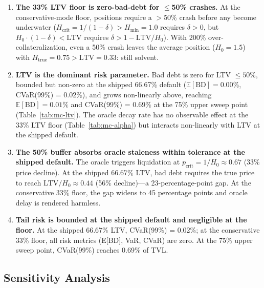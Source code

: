 \documentclass[10pt,a4paper,twocolumn]{article}
\begin{document}
\begin{enumerate}[leftmargin=*]
\item \textbf{The 33\% LTV floor is zero-bad-debt for $\leq$50\% crashes.} At the conservative-mode floor, positions require a $>$50\% crash before any become underwater ($H_{\text{crit}} = 1/(1{-}\delta) > H_{\min} = 1.0$ requires $\delta > 0$, but $H_0 \cdot (1{-}\delta) < \text{LTV}$ requires $\delta > 1 - \text{LTV}/H_0$). With 200\% over-collateralization, even a 50\% crash leaves the average position ($H_0 = 1.5$) with $H_{\text{true}} = 0.75 > \text{LTV} = 0.33$: still solvent.

\item \textbf{LTV is the dominant risk parameter.} Bad debt is zero for LTV $\leq 50\%$, bounded but non-zero at the shipped 66.67\% default ($\mathbb{E}[\text{BD}] = 0.00\%$, CVaR(99\%) = 0.02\%), and grows non-linearly above, reaching $\mathbb{E}[\text{BD}] = 0.01\%$ and CVaR(99\%) = 0.69\% at the 75\% upper sweep point (Table~\ref{tab:mc-ltv}). The oracle decay rate has no observable effect at the 33\% LTV floor (Table~\ref{tab:mc-alpha}) but interacts non-linearly with LTV at the shipped default.

\item \textbf{The 50\% buffer absorbs oracle staleness within tolerance at the shipped default.} The oracle triggers liquidation at $p_{\text{crit}} = 1/H_0 \approx 0.67$ (33\% price decline). At the shipped 66.67\% LTV, bad debt requires the true price to reach $\text{LTV}/H_0 \approx 0.44$ (56\% decline)---a 23-percentage-point gap. At the conservative 33\% floor, the gap widens to 45 percentage points and oracle delay is rendered harmless.

\item \textbf{Tail risk is bounded at the shipped default and negligible at the floor.} At the shipped 66.67\% LTV, CVaR(99\%) = 0.02\%; at the conservative 33\% floor, all risk metrics (E[BD], VaR, CVaR) are zero. At the 75\% upper sweep point, CVaR(99\%) reaches 0.69\% of TVL.
\end{enumerate}

\subsection{Sensitivity Analysis}
\label{sec:bd-sensitivity}
\end{document}
